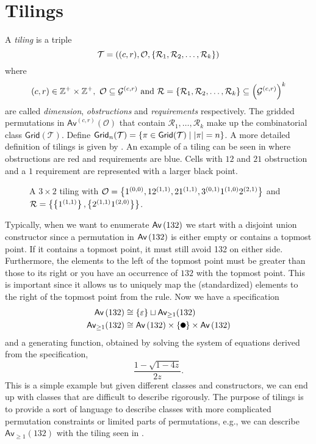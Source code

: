\section{Tilings\label{sec:tilings}}
A \emph{tiling} is a triple
\[
\mathcal{T} = ((c,r), \mathcal{O}, \left\{\mathcal{R}_1,\mathcal{R}_2,\dotsc,\mathcal{R}_k\right\})
\]
where
\[
    (c,r) \in \mathbb{Z}^+ \times \mathbb{Z}^+, \ \mathcal{O} \subseteq \mathcal{G}^{(c,r)} \text{ and } \mathcal{R}=\left\{\mathcal{R}_1,\mathcal{R}_2,\dotsc,\mathcal{R}_k\right\} \subseteq \left(\mathcal{G}^{(c,r)}\right)^k
\]
are called \emph{dimension}, \emph{obstructions} and \emph{requirements} respectively. The gridded permutations in $\textsf{Av}^{(c,r)}\left(\mathcal{O}\right)$ that contain $\mathcal{R}_1,\dotsc,\mathcal{R}_k$ make up the combinatorial class $\textsf{Grid}(\mathcal{T})$. Define $\textsf{Grid}_n(\mathcal{T}) = \left\{\pi \in \textsf{Grid}(\mathcal{T}) \mid |\pi| = n\right\}$. A more detailed definition of tilings is given by . An example of a tiling can be seen in  where obstructions are red and requirements are blue. Cells with $12$ and $21$ obstruction and a $1$ requirement are represented with a larger black point.

\begin{figure}[htbp]
    \centering
    
    \caption{A $3 \times 2$ tiling with $\mathcal{O} = \left\{1^{(0,0)},12^{(1,1)},21^{(1,1)},3^{(0,1)}1^{(1,0)}2^{(2,1)}\right\}$ and $\mathcal{R} = \left\{\left\{1^{(1,1)}\right\},\left\{2^{(1,1)}1^{(2,0)}\right\}\right\}$.}
    \label{fig:tiling_example}
\end{figure}

Typically, when we want to enumerate $\textsf{Av}\left(132\right)$ we start with a disjoint union constructor since a permutation in $\textsf{Av}\left(132\right)$ is either empty or contains a topmost point. If it contains a topmost point, it must still avoid 132 on either side. Furthermore, the elements to the left of the topmost point must be greater than those to its right or you have an occurrence of $132$ with the topmost point. This is important since it allows us to uniquely map the (standardized) elements to the right of the topmost point from the rule. Now we have a specification
\begin{align*}
\Av{132} &\cong \set{\varepsilon} \sqcup \textsf{Av}_{\geq1}(132)\\
\textsf{Av}_{\geq1}(132) &\cong \Av{132} \times \set{\point{0.1}} \times \Av{132}
\end{align*}
and a generating function, obtained by solving the system of equations derived from the specification,
\[
\frac{1-\sqrt{1-4z}}{2z}.
\]
This is a simple example but given different classes and constructors, we can end up with classes that are difficult to describe rigorously. The purpose of tilings is to provide a sort of language to describe classes with more complicated permutation constraints or limited parts of permutations, e.g., we can describe $\textsf{Av}_{\geq1}(132)$ with the tiling seen in .


